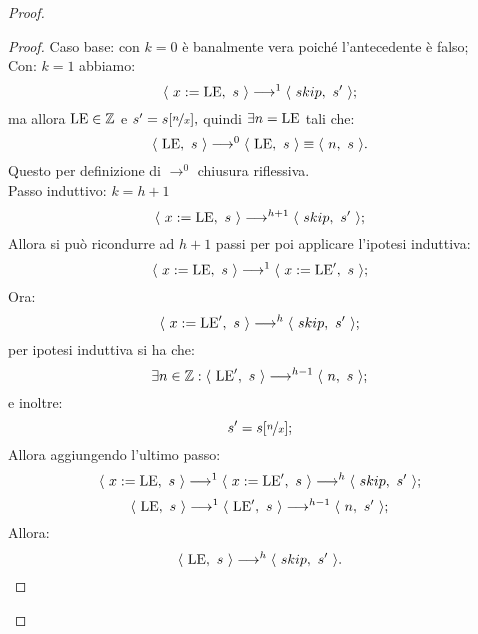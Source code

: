 \begin{teorema}
\begin{proof}
\begin{proof}
Caso base: con $k = 0$ è banalmente vera poiché l'antecedente è falso;\\
Con: $k = 1$ abbiamo:
\[
   \langle\ x:=\mathrm{LE},\ s\ \rangle \longrightarrow ^{1}\langle\ skip,\ s'\ \rangle;
\]
ma allora $\mathrm{LE} \in \mathbb{Z}$ e $s'=s[\nicefrac{n}{x}],$ quindi $\exists n=\mathrm{LE}$ tali che:
\[
   \langle\ \mathrm{LE},\ s\ \rangle \longrightarrow ^{0}\langle\ \mathrm{LE},\ s\ \rangle \equiv \langle\ n,\ s\ \rangle.
\]
Questo per definizione di $\rightarrow ^0$ chiusura riflessiva.\\
Passo induttivo: $k = h+1$
\[
   \langle\ x:=\mathrm{LE},\ s\ \rangle \longrightarrow ^{h+1}\langle\ skip,\ s'\ \rangle;
\]
Allora si può ricondurre ad $h+1$ passi per poi applicare l'ipotesi induttiva:
\[
   \langle\ x:=\mathrm{LE},\ s\ \rangle \longrightarrow ^{1}\langle\ x:=\mathrm{LE}',\ s\ \rangle;
\]
Ora:
\[
   \langle\ x:=\mathrm{LE}',\ s\ \rangle \longrightarrow ^{h}\langle\ skip,\ s'\ \rangle;
\]
per ipotesi induttiva si ha che:
\[
   \exists n \in\mathbb{Z}\mathrel{:} \langle\ \mathrm{LE}',\ s\ \rangle \longrightarrow ^{h-1}\langle\ n,\ s\ \rangle;
\]
e inoltre:
\[
   s'=s [\nicefrac{n}{x}];
\]
Allora aggiungendo l'ultimo passo:
\[
   \langle\ x:=\mathrm{LE},\ s\ \rangle \longrightarrow ^{1}\langle\ x:=\mathrm{LE}',\ s\ \rangle \longrightarrow ^{h} \langle\ skip,\ s'\ \rangle;
\]
\[
   \langle\ \mathrm{LE},\ s\ \rangle \longrightarrow ^{1}\langle\ \mathrm{LE}',\ s\ \rangle \longrightarrow ^{h-1} \langle\ n,\ s'\ \rangle;
\]
Allora:
\[
   \langle\ \mathrm{LE},\ s\ \rangle \longrightarrow ^{h} \langle\ skip,\ s'\ \rangle.
\]
\end{proof}


\end{proof}
\end{teorema}
